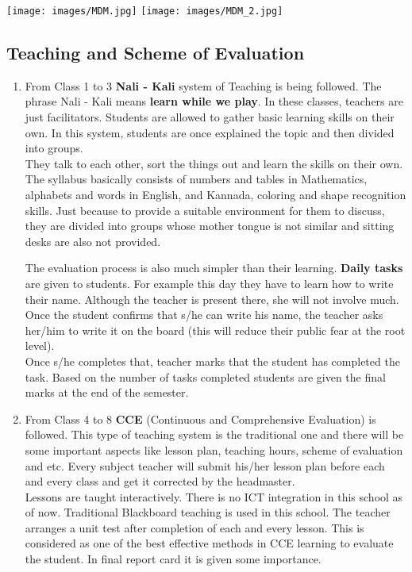     \texttt{[image: images/MDM.jpg]} \hfill
    \texttt{[image: images/MDM\_2.jpg]}
    
\subsection{Teaching and Scheme of Evaluation}
\begin{enumerate}
    \item From Class 1 to 3 \textbf{Nali - Kali} system of Teaching is being followed. The phrase Nali - Kali means \textbf{learn while we play}. In these classes, teachers are just facilitators. Students are allowed to gather basic learning skills on their own. In this system, students are once explained the topic and then divided into groups. \\
    They talk to each other, sort the things out and learn the skills on their own. The syllabus basically consists of numbers and tables in Mathematics, alphabets and words in English, and Kannada, coloring and shape recognition skills. Just because to provide a suitable environment for them to discuss, they are divided into groups whose mother tongue is not similar and sitting desks are also not provided.
    
    The evaluation process is also much simpler than their learning. \textbf{Daily tasks} are given to students. For example this day they have to learn how to write their name. Although the teacher is present there, she will not involve much. Once the student confirms that s/he can write his name, the teacher asks her/him to write it on the board (this will reduce their public fear at the root level). \\
    Once s/he completes that, teacher marks that the student has completed the task. Based on the number of tasks completed students are given the final marks at the end of the semester. 
    
    \item From Class 4 to 8 \textbf{CCE} (Continuous and Comprehensive Evaluation) is followed. This type of teaching system is the traditional one and there will be some important aspects like lesson plan, teaching hours, scheme of evaluation and etc. Every subject teacher will submit his/her lesson plan before each and every class and get it corrected by the headmaster. \\
    Lessons are taught interactively. There is no ICT integration in this school as of now. Traditional Blackboard teaching is used in this school. The teacher arranges a unit test after completion of each and every lesson. This is considered as one of the best effective methods in CCE learning to evaluate the student. In final report card it is given some importance.
    

\end{enumerate}
